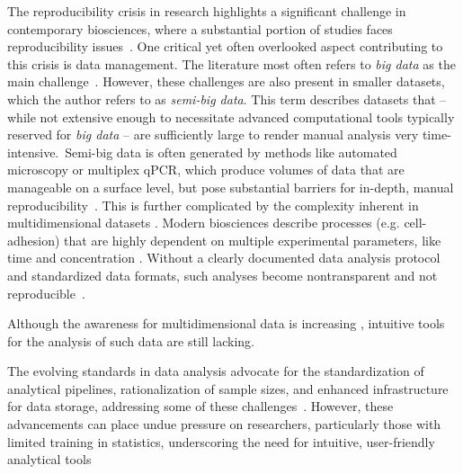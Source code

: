 \newpage



\label{C2:introduction}
The reproducibility crisis in research highlights a significant challenge in
contemporary biosciences, where a substantial portion of studies faces
reproducibility
issues~\cite{baker500ScientistsLift2016,begleyReproducibilityScienceImproving2015}.
One critical yet often overlooked aspect contributing to this crisis is data
management. The literature most often refers to \textit{big data} as the main
challenge~\cite{gomez-cabreroDataIntegrationEra2014}. However, these challenges
are also present in smaller datasets, which the author refers to as
\textit{semi-big data}. This term describes datasets that -- while not extensive
enough to necessitate advanced computational tools typically reserved for
\textit{big data} -- are sufficiently large to render manual analysis very
time-intensive.~Semi-big data is often generated by methods like automated
microscopy or multiplex qPCR, which produce volumes of data that are manageable
on a surface level, but pose substantial barriers for in-depth, manual
reproducibility~\cite{bustinReproducibilityBiomedicalResearch2014}. This is
further complicated by the complexity inherent in multidimensional datasets
\cite{krzywinskiMultidimensionalData2013}. Modern biosciences describe processes (e.g. cell-adhesion) that are highly dependent on multiple experimental parameters, like time and concentration \cite{reblTimedependentMetabolicActivity2010,
      mckayCellcellAdhesionMolecules1997}. Without a clearly
documented data analysis protocol and standardized data formats,
such analyses become nontransparent and not reproducible~\cite{bustinReproducibilityBiomedicalResearch2014}.

Although the awareness for multidimensional data is increasing
\cite{dunnExploringVisualizingMultidimensional2017}, intuitive tools for the
analysis of such data are still lacking.





The evolving standards in data analysis advocate for the standardization of
analytical pipelines, rationalization of sample sizes, and enhanced
infrastructure for data storage, addressing some of these
challenges~\cite{goodmanWhatDoesResearch2016,wilkinsonFAIRGuidingPrinciples2016}.
However, these advancements can place undue pressure on researchers,
particularly those with limited training in statistics, underscoring the need
for intuitive, user-friendly analytical
tools~\cite{gosselinInsufficientTransparencyStatistical2021,
      armstrongWhenUseBonferroni2014, gomez-lopezPrecisionMedicineNeeds2019,
      leekStatisticsValuesAre2015, incertiYouStillUsing2019a}

